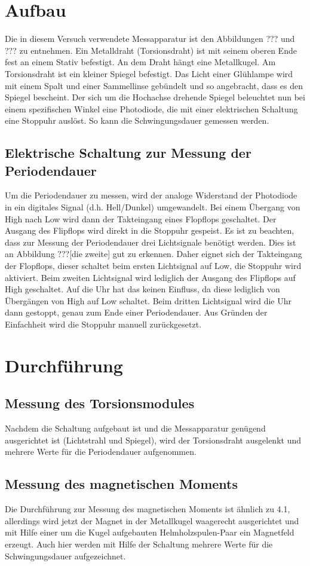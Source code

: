 \documentclass[11pt,ngerman,a4paper]{article}
\begin{document}
\section{Aufbau}

Die in diesem Versuch verwendete Messapparatur ist den Abbildungen ??? und ??? zu entnehmen. Ein Metalldraht (Torsionsdraht) ist mit seinem oberen Ende fest an einem Stativ befestigt. An dem Draht hängt eine Metallkugel. Am Torsionsdraht ist ein kleiner Spiegel befestigt. Das Licht einer Glühlampe wird mit einem Spalt und einer Sammellinse gebündelt und so angebracht, dass es den Spiegel bescheint. Der sich um die Hochachse drehende Spiegel beleuchtet nun bei einem spezifischen Winkel eine Photodiode, die mit einer elektrischen Schaltung eine Stoppuhr auslöst. So kann die Schwingungsdauer gemessen werden.
\subsection{Elektrische Schaltung zur Messung der Periodendauer}
Um die Periodendauer zu messen, wird der analoge Widerstand der Photodiode in ein digitales Signal (d.h. Hell/Dunkel) umgewandelt. Bei einem Übergang von High nach Low wird dann der Takteingang eines Flopflops geschaltet. Der Ausgang des Flipflops wird direkt in die Stoppuhr gespeist. Es ist zu beachten, dass zur Messung der Periodendauer drei Lichtsignale benötigt werden. Dies ist an Abbildung ???[die zweite] gut zu erkennen. Daher eignet sich der Takteingang der Flopflops, dieser schaltet beim ersten Lichtsignal auf Low, die Stoppuhr wird aktiviert. Beim zweiten Lichtsignal wird lediglich der Ausgang des Flipflops auf High geschaltet. Auf die Uhr hat das keinen Einfluss, da diese lediglich von Übergängen von High auf Low schaltet. Beim dritten Lichtsignal wird die Uhr dann gestoppt, genau zum Ende einer Periodendauer. Aus Gründen der Einfachheit wird die Stoppuhr manuell zurückgesetzt.
\section{Durchführung}
\subsection{Messung des Torsionsmodules}
Nachdem die Schaltung aufgebaut ist und die Messapparatur genügend ausgerichtet ist (Lichtstrahl und Spiegel), wird der Torsionsdraht ausgelenkt und mehrere Werte für die Periodendauer aufgenommen.
\subsection{Messung des magnetischen Moments}
Die Durchführung zur Messung des magnetischen Moments ist ähnlich zu 4.1, allerdings wird jetzt der Magnet in der Metallkugel waagerecht ausgerichtet und mit Hilfe einer um die Kugel aufgebauten Helmholzspulen-Paar ein Magnetfeld erzeugt. Auch hier werden mit Hilfe der Schaltung mehrere Werte für die Schwingungsdauer aufgezeichnet.
\end{document}
